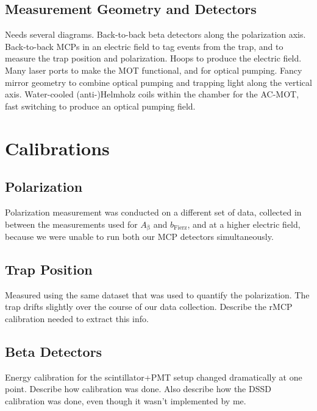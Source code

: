 	
	
\section{Measurement Geometry and Detectors}
	Needs several diagrams.  Back-to-back beta detectors along the polarization axis.  Back-to-back MCPs in an electric field to tag events from the trap, and to measure the trap position and polarization.  Hoops to produce the electric field.  Many laser ports to make the MOT functional, and for optical pumping.  Fancy mirror geometry to combine optical pumping and trapping light along the vertical axis.  Water-cooled (anti-)Helmholz coils within the chamber for the AC-MOT, fast switching to produce an optical pumping field.  


\clearpage	
\chapter{Calibrations}
\label{calibrations_chapter}
	
\section{Polarization}
	Polarization measurement was conducted on a different set of data, collected in between the measurements used for $A_{\mathrm{\beta}}$ and $b_{\mathrm{Fierz}}$, and at a higher electric field, because we were unable to run both our MCP detectors simultaneously.  
	
\section{Trap Position}
	Measured using the same dataset that was used to quantify the polarization.  The trap drifts slightly over the course of our data collection.  Describe the rMCP calibration needed to extract this info.  
	
\section{Beta Detectors}
	Energy calibration for the scintillator+PMT setup changed dramatically at one point.    Describe how calibration was done.  Also describe how the DSSD calibration was done, even though it wasn't implemented by me.  
	
